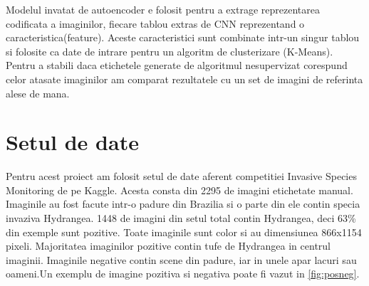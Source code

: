 \documentclass{article}
\begin{document}
Modelul invatat de autoencoder e folosit pentru a extrage reprezentarea codificata a imaginilor, fiecare tablou extras de CNN reprezentand o caracteristica(feature). Aceste caracteristici sunt combinate intr-un singur tablou si folosite ca date de intrare pentru un algoritm de clusterizare (K-Means). Pentru a stabili daca etichetele generate de algoritmul nesupervizat corespund celor atasate imaginilor am comparat rezultatele cu un set de imagini de referinta alese de mana.

\section{Setul de date}
Pentru acest proiect am folosit setul de date aferent competitiei Invasive Species Monitoring\cite{WEBSITE:6} de pe Kaggle. Acesta consta din 2295 de imagini etichetate manual. Imaginile au fost facute intr-o padure din Brazilia si o parte din ele contin specia invaziva Hydrangea. 1448 de imagini din setul total contin Hydrangea, deci 63\% din exemple sunt pozitive. Toate imaginile sunt color si au dimensiunea 866x1154 pixeli. Majoritatea imaginilor pozitive contin tufe de Hydrangea in centrul imaginii. Imaginile negative contin scene din padure, iar in unele apar lacuri sau oameni.Un exemplu de imagine pozitiva si negativa poate fi vazut in \ref{fig:posneg}.
\end{document}
